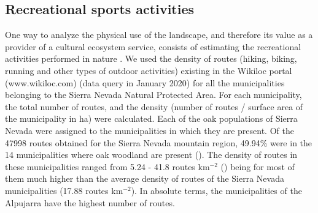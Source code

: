 \subsection{Recreational sports activities}\label{sec:es:cultural-sports}
One way to analyze the physical use of the landscape, and therefore its value as a provider of a cultural ecosystem service, consists of estimating the recreational activities performed in nature \autocites[][\emph{e.g.}]{RocesDiazetal2018AssessingDistribution}. We used the density of routes (hiking, biking, running and other types of outdoor activities) existing in the Wikiloc portal (www.wikiloc.com) (data query in January 2020) for all the municipalities belonging to the Sierra Nevada Natural Protected Area. For each municipality, the total number of routes, and the density (number of routes / surface area of the municipality in ha) were calculated. Each of the oak populations of Sierra Nevada were assigned to the municipalities in which they are present. Of the 47998 routes obtained for the Sierra Nevada mountain region, 49.94\% were in the 14 municipalities where oak woodland are present (). The density of routes in these municipalities ranged from 5.24 - 41.8 routes km$^{-2}$ () being for most of them much higher than the average density of routes of the Sierra Nevada municipalities (17.88 routes km$^{-2}$). In absolute terms, the municipalities of the Alpujarra have the highest number of routes.

\begin{table}[]
\caption{Wikilock routes density (routes km$^{-2}$), and routes total numbers, for the municipalities of Sierra Nevada where Pyrenean oak woodland are located}
\label{tab:es:wikiloc}
\end{table}

